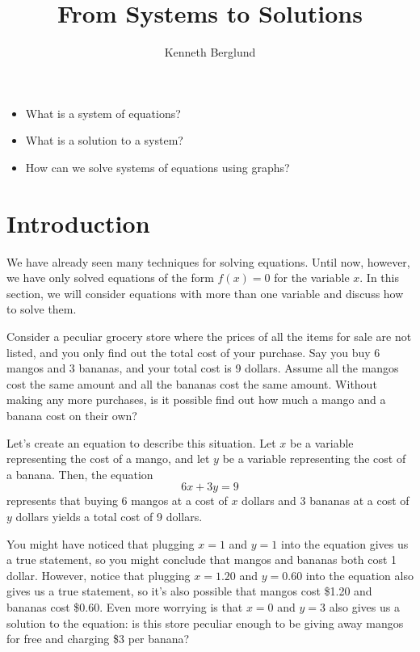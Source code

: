 \documentclass[nooutcomes]{ximera}
\author{Kenneth Berglund}
\title{From Systems to Solutions}
\begin{document}
\begin{abstract}
  
\end{abstract}
\maketitle


\begin{motivatingQuestions}\begin{itemize}
\item What is a system of equations?
\item What is a solution to a system?
\item How can we solve systems of equations using graphs?
\end{itemize}\end{motivatingQuestions}

\section{Introduction}

We have already seen many techniques for solving equations. Until now, however, we have only solved equations of the form $f(x) = 0$ for the variable $x$. In this section, we will consider equations with more than one variable and discuss how to solve them.

Consider a peculiar grocery store where the prices of all the items for sale are not listed, and you only find out the total cost of your purchase. Say you buy 6 mangos and 3 bananas, and your total cost is 9 dollars. Assume all the mangos cost the same amount and all the bananas cost the same amount. Without making any more purchases, is it possible find out how much a mango and a banana cost on their own? 

Let's create an equation to describe this situation. Let $x$ be a variable representing the cost of a mango, and let $y$ be a variable representing the cost of a banana. Then, the equation
$$
6x + 3y = 9
$$
represents that buying 6 mangos at a cost of $x$ dollars and 3 bananas at a cost of $y$ dollars yields a total cost of 9 dollars. 

You might have noticed that plugging $x = 1$ and $y = 1$ into the equation gives us a true statement, so you might conclude that mangos and bananas both cost 1 dollar. However, notice that plugging $x = 1.20$ and $y = 0.60$ into the equation also gives us a true statement, so it's also possible that mangos cost \$1.20 and bananas cost \$0.60. Even more worrying is that $x = 0$ and $y = 3$ also gives us a solution to the equation: is this store peculiar enough to be giving away mangos for free and charging \$3 per banana?
\end{document}
